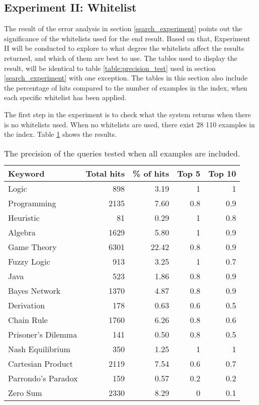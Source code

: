 \subsection{Experiment II: Whitelist}

The result of the error analysis in section \ref{search_experiment} points out the significance of the whitelists used for the end result. Based on that, Experiment II will be conducted to explore to what degree the whitelists affect the results returned, and which of them are best to use. The tables used to display the result, will be identical to table \ref{table:precision_test} used in section \ref{search_experiment} with one exception. The tables in this section also include the percentage of hits compared to the number of examples in the index, when each specific whitelist has been applied. 

The first step in the experiment is to check what the system returns when there is no whitelists used. When no whitelists are used, there exist 28 110 examples in the index. Table \ref{table:p_test_no-list} shows the results.

\begin{table}[h]
\centering
\small
\begin{tabular} {|| p{10em} | r | r | r | r ||} 
 \hline
 Keyword & Total hits & \% of hits & Top 5 & Top 10 \\ [0.5ex] 
 \hline

Logic & 898 & 3.19 & 1 & 1 \\
Programming & 2135 & 7.60 & 0.8 & 0.9 \\
Heuristic & 81 & 0.29 & 1 & 0.8 \\
Algebra & 1629 & 5.80 & 1 & 0.9 \\
Game Theory & 6301 & 22.42 & 0.8 & 0.9 \\
\hline
Fuzzy Logic & 913 & 3.25 & 1 & 0.7 \\
Java & 523 & 1.86 & 0.8 & 0.9 \\
Bayes Network & 1370 & 4.87 & 0.8 & 0.9 \\
Derivation & 178 & 0.63 & 0.6 & 0.5 \\
\hline
Chain Rule & 1760 & 6.26 & 0.8 & 0.6 \\
Prisoner's Dilemma & 141 & 0.50 & 0.8 & 0.5 \\
Nash Equilibrium & 350 & 1.25 & 1 & 1 \\
Cartesian Product & 2119 & 7.54 & 0.6 & 0.7 \\
Parrondo's Paradox & 159 & 0.57 &  0.2 & 0.2 \\
Zero Sum & 2330 & 8.29 & 0 & 0.1 \\

 \hline
\end{tabular}
\caption{The precision of the queries tested when all examples are included.}
\label{table:p_test_no-list}
\end{table}
\clearpage

